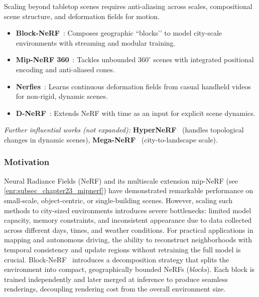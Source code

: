 \begin{enrichment}
    Scaling beyond tabletop scenes requires anti-aliasing across scales, compositional scene structure, and deformation fields for motion.
    
    \begin{itemize}
        \item \textbf{Block-NeRF}~\cite{tancik2022_blocknerf}: Composes geographic “blocks’’ to model city-scale environments with streaming and modular training.
        \item \textbf{Mip-NeRF 360}~\cite{barron2022_mipnerf360}: Tackles unbounded $360^\circ$ scenes with integrated positional encoding and anti-aliased cones.
        \item \textbf{Nerfies}~\cite{park2021_nerfies}: Learns continuous deformation fields from casual handheld videos for non-rigid, dynamic scenes.
        \item \textbf{D-NeRF}~\cite{pumarola2021_dnerf}: Extends NeRF with time as an input for explicit scene dynamics.
    \end{itemize}
    
    \noindent\textit{Further influential works (not expanded):} \textbf{HyperNeRF}~\cite{park2021_hypernerf} (handles topological changes in dynamic scenes), \textbf{Mega-NeRF}~\cite{turki2022_meganerf} (city-to-landscape scale).
    
    \begin{enrichment}
        \label{enr:chapter23_blocknerf}
        
        \subsubsection{Motivation}
        \label{subsec:chapter23_blocknerf_motivation}
        Neural Radiance Fields (NeRF) and its multiscale extension mip-NeRF (see \ref{enr:subsec_chapter23_mipnerf}) have demonstrated remarkable performance on small-scale, object-centric, or single-building scenes. However, scaling such methods to city-sized environments introduces severe bottlenecks: limited model capacity, memory constraints, and inconsistent appearance due to data collected across different days, times, and weather conditions. For practical applications in mapping and autonomous driving, the ability to reconstruct neighborhoods with temporal consistency and update regions without retraining the full model is crucial. Block-NeRF~\cite{tancik2022_blocknerf} introduces a decomposition strategy that splits the environment into compact, geographically bounded NeRFs (\emph{blocks}). Each block is trained independently and later merged at inference to produce seamless renderings, decoupling rendering cost from the overall environment size.
        

\end{enrichment}
\end{enrichment}
